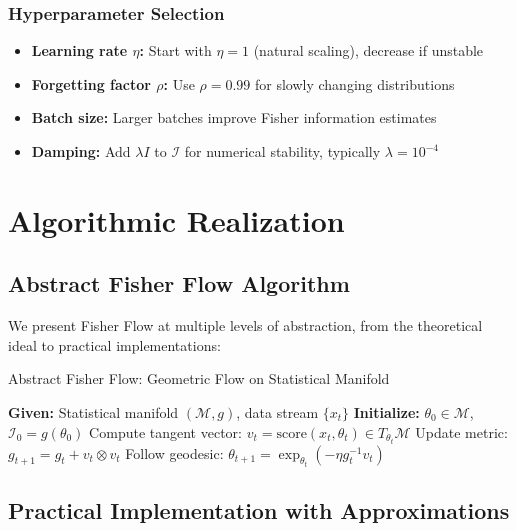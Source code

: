 \documentclass[11pt]{article}
\begin{document}
\subsubsection{Hyperparameter Selection}

\begin{itemize}
\item \textbf{Learning rate $\eta$:} Start with $\eta = 1$ (natural scaling), decrease if unstable
\item \textbf{Forgetting factor $\rho$:} Use $\rho = 0.99$ for slowly changing distributions
\item \textbf{Batch size:} Larger batches improve Fisher information estimates
\item \textbf{Damping:} Add $\lambda I$ to $\mathcal{I}$ for numerical stability, typically $\lambda = 10^{-4}$
\end{itemize}

\section{Algorithmic Realization}

\subsection{Abstract Fisher Flow Algorithm}

We present Fisher Flow at multiple levels of abstraction, from the theoretical ideal to practical implementations:

\begin{algorithm}[h]
\caption{Abstract Fisher Flow: Geometric Flow on Statistical Manifold}
\label{alg:abstract_lpi}
\begin{algorithmic}[1]
\State \textbf{Given:} Statistical manifold $(\mathcal{M}, g)$, data stream $\{x_t\}$
\State \textbf{Initialize:} $\theta_0 \in \mathcal{M}$, $\mathcal{I}_0 = g(\theta_0)$
\State Compute tangent vector: $v_t = \text{score}(x_t, \theta_t) \in T_{\theta_t}\mathcal{M}$
\State Update metric: $g_{t+1} = g_t + v_t \otimes v_t$
\State Follow geodesic: $\theta_{t+1} = \exp_{\theta_t}(-\eta g_t^{-1} v_t)$
\EndWhile
\end{algorithmic}
\end{algorithm}

\subsection{Practical Implementation with Approximations}
\end{document}
